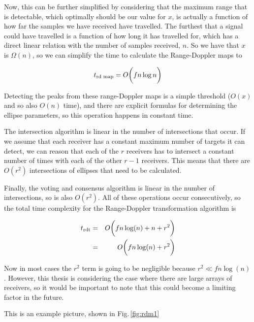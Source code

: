 \documentclass[12pt,openany,a4paper]{book}
\newcommand{\fig}[1]  {Fig.\,\ref{#1}}		%
\begin{document}
\bigskip

Now, this can be further simplified by considering that the maximum range that is detectable, which optimally should be our value for $x$, is actually a function of how far the samples we have received have travelled. The furthest that a signal could have travelled is a function of how long it has travelled for, which has a direct linear relation with the number of samples received, $n$. So we have that $x$ is $\Omega(n)$, so we can simplify the time to calculate the Range-Doppler maps to

\begin{equation}
t_{\textnormal{rd map}} = O\bigg(fn \log n \bigg)
\end{equation}

\bigskip

Detecting the peaks from these range-Doppler maps is a simple threshold ($O(x)$ and so also $O(n)$ time), and there are explicit formulas for determining the ellipse parameters, so this operation happens in constant time.

\bigskip
The intersection algorithm is linear in the number of intersections that occur. If we assume that each receiver has a constant maximum number of targets it can detect, we can reason that each of the $r$ receivers has to intersect a constant number of times with each of the other $r-1$ receivers. This means that there are $O(r^2)$ intersections of ellipses that need to be calculated.

\bigskip

Finally, the voting and consensus algorithm is linear in the number of intersections, so is also $O(r^2)$. All of these operations occur consecutively, so the total time complexity for the Range-Doppler transformation algorithm is

\begin{eqnarray}
t_{\textnormal{rdt}} &=&  O\bigg(fn \log (n) + n + r^2 \bigg) \\
&=&  O\bigg(fn \log (n) + r^2 \bigg)
\end{eqnarray}

Now in most cases the $r^2$ term is going to be negligible because $r^2 \ll fn \log (n)$. However, this thesis is considering the case where there are large arrays of receivers, so it would be important to note that this could become a limiting factor in the future.

This is an example picture, shown in \fig{fig:rdm1}
\end{document}
